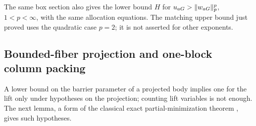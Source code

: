 The same box section also gives the lower bound $H$ for
$u_{aG}>\lVert w_{aG}\rVert_p^p$, $1<p<\infty$, with the same allocation
equations.  The matching upper bound just proved uses the quadratic
case $p=2$; it is not asserted for other exponents.

\subsection{Bounded-fiber projection and one-block column packing}

A lower bound on the barrier parameter of a projected body implies one
for the lift only under hypotheses on the projection; counting lift
variables is not enough.  The next lemma, a form of the classical exact
partial-minimization theorem \cite[Theorem~5.2.1]{Chares2009}, gives
such hypotheses.

